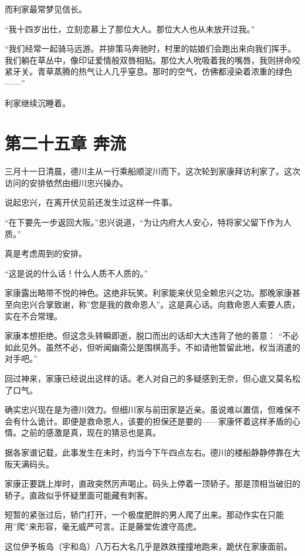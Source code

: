\documentclass[
]{book}
\begin{document}
而利家最常梦见信长。

``我十四岁出仕，立刻恋慕上了那位大人。那位大人也从未放开过我。''

``我们经常一起骑马远游。并排策马奔驰时，村里的姑娘们会跑出来向我们挥手。我们躺在草丛中，像印证爱情般双唇相贴。那位大人吮吸着我的嘴唇，我则拼命咬紧牙关。青草蒸腾的热气让人几乎窒息。那时的空气，仿佛都浸染着浓重的绿色------''

利家继续沉睡着。

\chapter*{第二十五章 奔流}\label{ux7b2cux4e8cux5341ux4e94ux7ae0-ux5954ux6d41}

三月十一日清晨，德川主从一行乘船顺淀川而下。这次轮到家康拜访利家了。这次访问的安排依然由细川忠兴操办。

说起忠兴，在离开伏见前还发生过这样一件事。

``在下要先一步返回大阪。''忠兴说道，``为让内府大人安心，特将家父留下作为人质。''

真是考虑周到的安排。

``这是说的什么话！什么人质不人质的。''

家康露出略带不悦的神色。这绝非玩笑。利家能来伏见全赖忠兴之功。那晚家康甚至向忠兴合掌致谢，称''您是我的救命恩人''。这是真心话。向救命恩人索要人质，实在不合常理。

家康本想拒绝。但这念头转瞬即逝，脱口而出的话却大大违背了他的善意：
``不必如此见外。虽然不必，但听闻幽斋公是围棋高手。不如请他暂留此地，权当消遣的对手吧。''

回过神来，家康已经说出这样的话。老人对自己的多疑感到无奈，但心底又莫名松了口气。

确实忠兴现在是为德川效力。但细川家与前田家是近亲。虽说难以置信，但难保不会有什么诡计。即便是救命恩人，该要的担保还是要的------家康怀着这样矛盾的心情。之前的感激是真，现在的猜忌也是真。

据各家谱记载，此事发生在未时，约当今下午四点左右。德川的楼船静静停靠在大阪天满码头。

家康正要跳上岸时，直政突然厉声喝止。码头上停着一顶轿子。那是顶相当破旧的轿子。直政似乎怀疑里面可能藏有刺客。

短暂的紧张过后，轿门打开，一个极度肥胖的男人爬了出来。那动作实在只能用''爬''来形容，毫无威严可言。正是藤堂佐渡守高虎。

这位伊予板岛（宇和岛）八万石大名几乎是跌跌撞撞地跑来，跪伏在家康面前。
\end{document}
